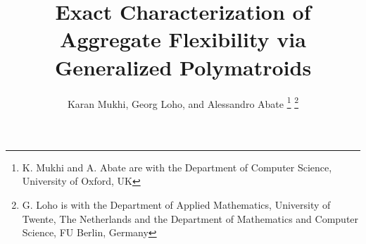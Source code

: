 \documentclass[journal]{IEEEtran}
\begin{document}
\title{Exact Characterization of Aggregate Flexibility via Generalized Polymatroids}

\author{
    Karan Mukhi,
    Georg Loho,
    and Alessandro Abate
    \thanks{K. Mukhi and A. Abate are with the Department of Computer Science, University of Oxford, UK}
    \thanks{G. Loho is with the Department of Applied Mathematics, University of Twente, The Netherlands and the Department of Mathematics and Computer Science, FU Berlin, Germany}
}




\maketitle

\begin{abstract}

\end{abstract}













\printnomenclature




\appendix


\vfill
\end{document}

